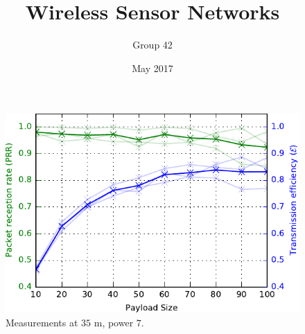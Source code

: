 \documentclass[11pt,a4paper]{article}
\title{Wireless Sensor Networks}
\author{Group 42}
\date{May 2017}
\begin{document}
		
\maketitle

\begin{figure}
\centering
\includegraphics[scale=1]{figs/testFig.pdf} 
\caption{Measurements at $35$ m, power $7$.}
\end{figure}
\end{document}
